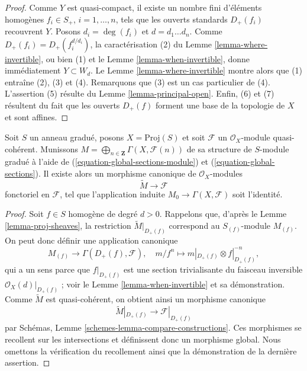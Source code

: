 \begin{proof}
Comme $Y$ est quasi-compact, il existe un nombre fini d'éléments homogènes
$f_i \in S_{+}$, $i = 1, \ldots, n$, tels que les ouverts standards
$D_{+}(f_i)$ recouvrent $Y$. Posons $d_i = \deg(f_i)$ et
$d = d_1 \ldots d_n$. Comme
$D_{+}(f_i) = D_{+}(f_i^{d/d_i})$, la caractérisation (2) du
Lemme \ref{lemma-where-invertible}, ou bien (1) et le
Lemme \ref{lemma-when-invertible}, donne immédiatement $Y \subset W_d$.
Le Lemme \ref{lemma-where-invertible} montre alors que (1) entraîne (2), (3)
et (4). Remarquons que (3) est un cas particulier de (4).
L'assertion (5) résulte du Lemme \ref{lemma-principal-open}.
Enfin, (6) et (7) résultent du fait que les ouverts $D_{+}(f)$ forment une
base de la topologie de $X$ et sont affines.
\end{proof}

\begin{lemma}
\label{lemma-comparison-proj-quasi-coherent}
Soit $S$ un anneau gradué, posons $X = \text{Proj}(S)$ et soit
$\mathcal{F}$ un $\mathcal{O}_X$-module quasi-cohérent. Munissons
$M = \bigoplus_{n \in \mathbf{Z}} \Gamma(X, \mathcal{F}(n))$ de sa structure
de $S$-module gradué à l'aide de
(\ref{equation-global-sections-module}) et (\ref{equation-global-sections}).
Il existe alors un morphisme canonique de $\mathcal{O}_X$-modules
$$
\widetilde{M} \longrightarrow \mathcal{F}
$$
fonctoriel en $\mathcal{F}$, tel que l'application induite
$M_0 \to \Gamma(X, \mathcal{F})$ soit l'identité.
\end{lemma}

\begin{proof}
Soit $f \in S$ homogène de degré $d > 0$. Rappelons que, d'après le
Lemme \ref{lemma-proj-sheaves}, la restriction
$\widetilde{M}|_{D_{+}(f)}$ correspond au $S_{(f)}$-module $M_{(f)}$.
On peut donc définir une application canonique
$$
M_{(f)} \longrightarrow \Gamma(D_+(f), \mathcal{F}),\quad
m/f^n \longmapsto m|_{D_+(f)} \otimes f|_{D_+(f)}^{-n},
$$
qui a un sens parce que $f|_{D_+(f)}$ est une section trivialisante du
faisceau inversible $\mathcal{O}_X(d)|_{D_+(f)}$ ; voir le
Lemme \ref{lemma-when-invertible} et sa démonstration. Comme $\widetilde{M}$
est quasi-cohérent, on obtient ainsi un morphisme canonique
$$
\widetilde{M}|_{D_+(f)} \longrightarrow \mathcal{F}|_{D_+(f)}
$$
par Schémas, Lemme \ref{schemes-lemma-compare-constructions}.
Ces morphismes se recollent sur les intersections et définissent donc un
morphisme global. Nous omettons la vérification du recollement ainsi que la
démonstration de la dernière assertion.
\end{proof}


